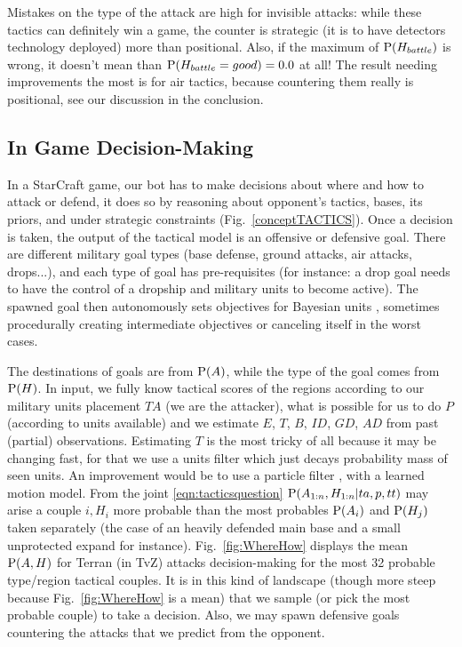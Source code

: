 Mistakes on the type of the attack are high for invisible attacks: while these tactics can definitely win a game, the counter is strategic (it is to have detectors technology deployed) more than positional. Also, if the maximum of $\mathrm{P}(H_{battle})$ is wrong, it doesn't mean than $\mathrm{P}(H_{battle}=good)=0.0$ at all! The result needing improvements the most is for air tactics, because countering them really is positional, see our discussion in the conclusion.

\subsection{In Game Decision-Making}
In a StarCraft game, our bot has to make decisions about where and how to attack or defend, it does so by reasoning about opponent's tactics, bases, its priors, and under strategic constraints (Fig.~\ref{conceptTACTICS}). Once a decision is taken, the output of the tactical model is an offensive or defensive goal. There are different military goal types (base defense, ground attacks, air attacks, drops...), and each type of goal has pre-requisites (for instance: a drop goal needs to have the control of a dropship and military units to become active). The spawned goal then autonomously sets objectives for Bayesian units \cite{SYNNAEVE:Micro}, sometimes procedurally creating intermediate objectives or canceling itself in the worst cases. 

The destinations of goals are from $\mathrm{P}(A)$, while the type of the goal comes from $\mathrm{P}(H)$. In input, we fully know tactical scores of the regions according to our military units placement $TA$ (we are the attacker), what is possible for us to do $P$ (according to units available) and we estimate $E$, $T$, $B$, $ID$, $GD$, $AD$ from past (partial) observations. Estimating $T$ is the most tricky of all because it may be changing fast, for that we use a units filter which just decays probability mass of seen units. An improvement would be to use a particle filter \cite{weber2011aiide}, with a learned motion model. From the joint \ref{eqn:tacticsquestion} $\mathrm{P}(A_{1:n},H_{1:n}|ta,p,tt)$ may arise a couple $i,H_i$ more probable than the most probables $\mathrm{P}(A_i)$ and $\mathrm{P}(H_j)$ taken separately (the case of an heavily defended main base and a small unprotected expand for instance). Fig.~\ref{fig:WhereHow} displays the mean $\mathrm{P}(A,H)$ for Terran (in TvZ) attacks decision-making for the most 32 probable type/region tactical couples. It is in this kind of landscape (though more steep because Fig.~\ref{fig:WhereHow} is a mean) that we sample (or pick the most probable couple) to take a decision. Also, we may spawn defensive goals countering the attacks that we predict from the opponent.

